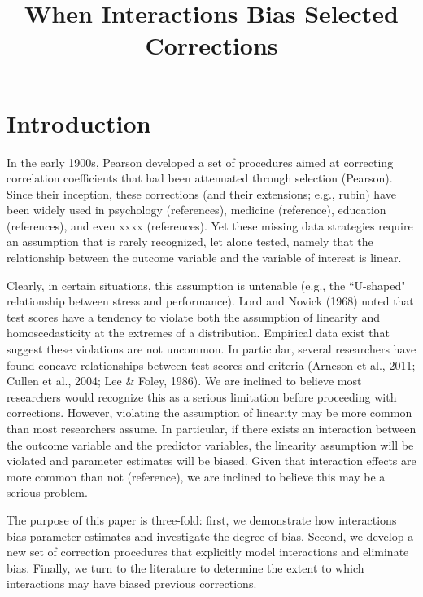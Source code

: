 \documentclass[doc, babel,english]{apa}%
\title{When Interactions Bias Selected Corrections}
\begin{document}
\maketitle   



\section{Introduction} 
In the early 1900s, Pearson developed a set of procedures aimed at correcting correlation coefficients that had been attenuated through selection (Pearson). Since their inception, these corrections (and their extensions; e.g., rubin) have been widely used in psychology (references), medicine (reference), education (references), and even xxxx (references). Yet these missing data strategies require an assumption that is rarely recognized, let alone tested, namely that the relationship between the outcome variable and the variable of interest is linear. 

Clearly, in certain situations, this assumption is untenable (e.g., the ``U-shaped"  relationship between stress and performance). Lord and Novick (1968) noted that test scores have a tendency to violate both the assumption of linearity and homoscedasticity at the extremes of a distribution. Empirical data exist that suggest these violations are not uncommon. In particular, several researchers have found concave relationships between test scores and criteria (Arneson et al., 2011; Cullen et al., 2004; Lee \& Foley, 1986). We are inclined to believe most researchers would recognize this as a serious limitation before proceeding with corrections. However, violating the assumption of linearity may be more common than most researchers assume. In particular, if there exists an interaction between the outcome variable and the predictor variables, the linearity assumption will be violated and parameter estimates will be biased. Given that interaction effects are more common than not (reference), we are inclined to believe this may be a serious problem. 

The purpose of this paper is three-fold: first, we demonstrate how interactions bias parameter estimates and investigate the degree of bias. Second, we develop a new set of correction procedures that explicitly model interactions and eliminate bias. Finally, we turn to the literature to determine the extent to which interactions may have biased previous corrections. 
\end{document}
